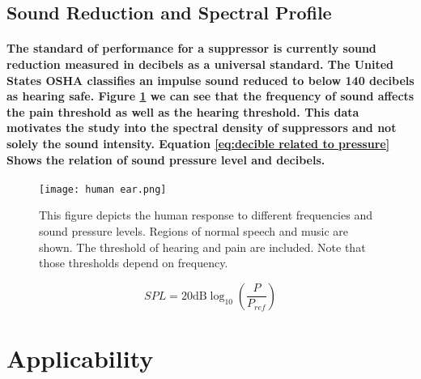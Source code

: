 \subsection{Sound Reduction and Spectral Profile}

\paragraph{The standard of performance for a suppressor is currently sound reduction measured in decibels as a universal standard. The United States OSHA classifies an impulse sound reduced to below 140 decibels as hearing safe. Figure \ref{fig:Sound for Human Ear} we can see that the frequency of sound affects the pain threshold as well as the hearing threshold. This data motivates the study into the spectral density of suppressors and not solely the sound intensity. Equation \ref{eq:decible related to pressure} Shows the relation of sound pressure level and decibels.}



\begin{figure}
	\centering
	\texttt{[image: human ear.png]}
	\caption[Human hearing diagram]{This figure depicts the human response to different frequencies and sound pressure levels. Regions of normal speech and music are shown. The threshold of hearing and pain are included. Note that those thresholds depend on frequency. \cite{commonswikimedia1}}
	\label{fig:Sound for Human Ear}
\end{figure}

\Large
\begin{equation}
	SPL=20\mathrm{dB}\log_{10} (\frac{P}{P_{ref}})
	\label{eq:decible related to pressure}
\end{equation}





\section{Applicability}

